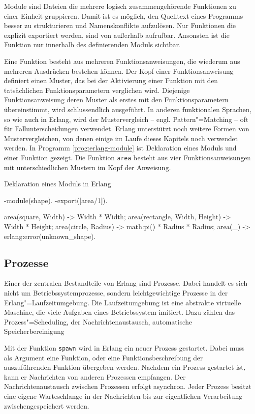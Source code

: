 Module sind Dateien die mehrere logisch zusammengehörende Funktionen zu einer Einheit gruppieren. Damit ist es möglich, den Quelltext eines Programms besser zu strukturieren und Namenskonflikte aufzulösen. Nur Funktionen die explizit exportiert werden, sind von außerhalb aufrufbar. Ansonsten ist die Funktion nur innerhalb des definierenden Moduls sichtbar.

Eine Funktion besteht aus mehreren Funktionsanweisungen, die wiederum aus mehreren Ausdrücken bestehen können. Der Kopf einer Funktionsanweisung definiert einen Muster, das bei der Aktivierung einer Funktion mit den tatsächlichen Funktionsparametern verglichen wird. Diejenige Funktionsanweisung deren Muster als erstes mit den Funktionsparametern übereinstimmt, wird schlussendlich ausgeführt. In anderen funktionalen Sprachen, so wie auch in Erlang, wird der Mustervergleich -- engl. Pattern"=Matching -- oft für Fallunterscheidungen verwendet. Erlang unterstützt noch weitere Formen von Mustervergleichen, von denen einige im Laufe dieses Kapitels noch verwendet werden. In Programm \ref{prog:erlang-module} ist Deklaration eines Moduls und einer Funktion gezeigt. Die Funktion \lstinline{area} besteht aus vier Funktionsanweisungen mit unterschiedlichen Mustern im Kopf der Anweisung.

\begin{program}[!hbt]
\caption{Deklaration eines Moduls in Erlang}
\label{prog:erlang-module}
\begin{ErlangCode}
-module(shape).
-export([area/1]).

area({square, Width}) -> Width * Width;
area({rectangle, Width, Height}) -> Width * Height;
area({circle, Radius}) -> math:pi() * Radius * Radius;
area(_) -> erlang:error(unknown_shape).
\end{ErlangCode}
\end{program}

\subsection{Prozesse}

Einer der zentralen Bestandteile von Erlang sind Prozesse. Dabei handelt es sich nicht um Betriebssystemprozesse, sondern leichtgewichtige Prozesse in der Erlang"=Laufzeitumgebung. Die Laufzeitumgebung ist eine abstrakte virtuelle Maschine, die viele Aufgaben eines Betriebssystem imitiert. Dazu zählen das Prozess"=Scheduling, der Nachrichtenaustausch, automatische Speicherbereinigung \usw

Mit der Funktion \lstinline{spawn} wird in Erlang ein neuer Prozess gestartet. Dabei muss als Argument eine Funktion, oder eine Funktionsbeschreibung der auszuführenden Funktion übergeben werden. Nachdem ein Prozess gestartet ist, kann er Nachrichten von anderen Prozessen empfangen. Der Nachrichtenaustausch zwischen Prozessen erfolgt asynchron. Jeder Prozess besitzt eine eigene Warteschlange in der Nachrichten bis zur eigentlichen Verarbeitung zwischengespeichert werden.

